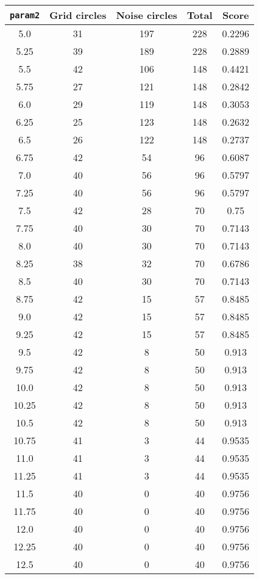 \documentclass[letterpaper, 12pt]{article}
\begin{document}
\begin{longtable}{|c|c|c|c|c|}
\hline
\textbf{\texttt{param2}} & \textbf{Grid circles} & \textbf{Noise circles} & \textbf{Total} & \textbf{Score} \\
\hline
5.0 & 31 & 197 & 228 & 0.2296 \\
\hline
5.25 & 39 & 189 & 228 & 0.2889 \\
\hline
5.5 & 42 & 106 & 148 & 0.4421 \\
\hline
5.75 & 27 & 121 & 148 & 0.2842 \\
\hline
6.0 & 29 & 119 & 148 & 0.3053 \\
\hline
6.25 & 25 & 123 & 148 & 0.2632 \\
\hline
6.5 & 26 & 122 & 148 & 0.2737 \\
\hline
6.75 & 42 & 54 & 96 & 0.6087 \\
\hline
7.0 & 40 & 56 & 96 & 0.5797 \\
\hline
7.25 & 40 & 56 & 96 & 0.5797 \\
\hline
7.5 & 42 & 28 & 70 & 0.75 \\
\hline
7.75 & 40 & 30 & 70 & 0.7143 \\
\hline
8.0 & 40 & 30 & 70 & 0.7143 \\
\hline
8.25 & 38 & 32 & 70 & 0.6786 \\
\hline
8.5 & 40 & 30 & 70 & 0.7143 \\
\hline
8.75 & 42 & 15 & 57 & 0.8485 \\
\hline
9.0 & 42 & 15 & 57 & 0.8485 \\
\hline
9.25 & 42 & 15 & 57 & 0.8485 \\
\hline
9.5 & 42 & 8 & 50 & 0.913 \\
\hline
9.75 & 42 & 8 & 50 & 0.913 \\
\hline
10.0 & 42 & 8 & 50 & 0.913 \\
\hline
10.25 & 42 & 8 & 50 & 0.913 \\
\hline
10.5 & 42 & 8 & 50 & 0.913 \\
\hline
10.75 & 41 & 3 & 44 & 0.9535 \\
\hline
11.0 & 41 & 3 & 44 & 0.9535 \\
\hline
11.25 & 41 & 3 & 44 & 0.9535 \\
\hline
11.5 & 40 & 0 & 40 & 0.9756 \\
\hline
11.75 & 40 & 0 & 40 & 0.9756 \\
\hline
12.0 & 40 & 0 & 40 & 0.9756 \\
\hline
12.25 & 40 & 0 & 40 & 0.9756 \\
\hline
12.5 & 40 & 0 & 40 & 0.9756 \\

\end{longtable}
\end{document}
